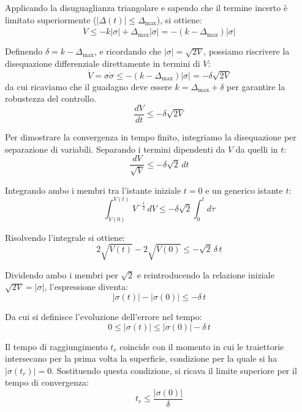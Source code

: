Applicando la disuguaglianza triangolare e sapendo che il termine incerto è limitato superiormente ($|\Delta(t)| \le \Delta_{\max}$), si ottiene:
\begin{equation}
    \dot{V} \le -k|\sigma| + \Delta_{\max}|\sigma| = - (k - \Delta_{\max}) |\sigma|
\end{equation}

Definendo $\delta = k - \Delta_{\max}$, e ricordando che $|\sigma| = \sqrt{2V}$, possiamo riscrivere la disequazione differenziale direttamente in termini di $V$:
\begin{equation}
        \dot{V} = \sigma\dot{\sigma} \le -(k - \Delta_{\max})|\sigma| = -\delta \sqrt{2V}
\end{equation}
da cui ricaviamo che il guadagno deve essere $k = \Delta_{\max} + \delta$ per garantire la robustezza del controllo.
\begin{equation}
    \frac{dV}{dt} \le -\delta \sqrt{2V}
\end{equation}

Per dimostrare la convergenza in tempo finito, integriamo la disequazione per separazione di variabili. Separando i termini dipendenti da $V$ da quelli in $t$:
\begin{equation}
    \frac{dV}{\sqrt{V}} \le -\delta \sqrt{2} \, dt
\end{equation}

Integrando ambo i membri tra l'istante iniziale $t=0$ e un generico istante $t$:
\begin{equation}
    \int_{V(0)}^{V(t)} V^{-\frac{1}{2}} \, dV \le -\delta \sqrt{2} \int_{0}^{t} d\tau
\end{equation}

Risolvendo l'integrale si ottiene:
\begin{equation}
    2\sqrt{V(t)} - 2\sqrt{V(0)} \le -\sqrt{2} \, \delta \, t
\end{equation}

Dividendo ambo i membri per $\sqrt{2}$ e reintroducendo la relazione iniziale $\sqrt{2V} = |\sigma|$, l'espressione diventa:
\begin{equation}
    |\sigma(t)| - |\sigma(0)| \le - \delta \, t
\end{equation}

Da cui si definisce l'evoluzione dell'errore nel tempo:
\begin{equation}
    0 \le |\sigma(t)| \le |\sigma(0)| - \delta \, t
\end{equation}

Il tempo di raggiungimento $t_r$ coincide con il momento in cui le traiettorie intersecano per la prima volta la superficie, condizione per la quale si ha $|\sigma(t_r)| = 0$. Sostituendo questa condizione, si ricava il limite superiore per il tempo di convergenza:
\begin{equation}
    t_r \le \frac{|\sigma(0)|}{\delta}
\end{equation}


